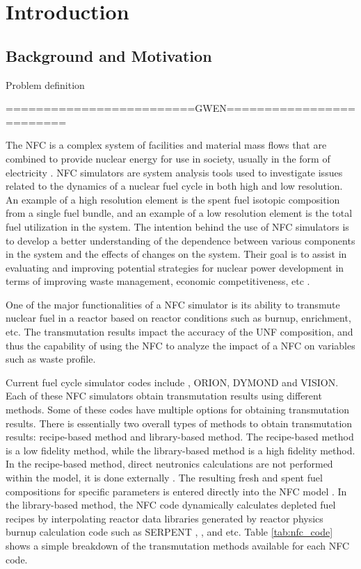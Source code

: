 \section{Introduction}
\subsection{Background and Motivation}
Problem definition

=========================GWEN=========================

The \gls{NFC} is a complex system of facilities and material 
mass flows that are combined to provide nuclear energy for use 
in society, usually in the form of electricity 
\cite{yacout_modeling_2005}. 
\gls{NFC} simulators are system analysis tools used to investigate 
issues related to the dynamics of a nuclear fuel cycle in both 
high and low resolution. 
An example of a high resolution element is the spent fuel 
isotopic composition from a single fuel bundle, and an example 
of a low resolution element is the total fuel utilization in 
the system. 
The intention behind the use of \gls{NFC} simulators is to develop 
a better understanding of the dependence between various components 
in the system and the effects of changes on the system. 
Their goal is to assist in evaluating and improving potential 
strategies for nuclear power development in terms of improving waste 
management, economic competitiveness, etc \cite{yacout_modeling_2005}.   

One of the major functionalities of a \gls{NFC} simulator is its 
ability to transmute nuclear fuel in a reactor based on reactor 
conditions such as burnup, enrichment, etc. 
The transmutation results impact the accuracy of the \gls{UNF} 
composition, and thus the capability of using the \gls{NFC} to 
analyze the impact of a \gls{NFC} on variables such as waste profile.  

Current fuel cycle simulator codes include \Cyclus, ORION, DYMOND 
and VISION. 
Each of these NFC simulators obtain transmutation results using 
different methods. 
Some of these codes have multiple options for obtaining 
transmutation results. 
There is essentially two overall types of methods to obtain transmutation 
results: recipe-based method and library-based method. 
The recipe-based method is a low fidelity method, while the library-based method is 
a high fidelity method. 
In the recipe-based method, direct neutronics calculations are not performed 
within the model, it is done externally \cite{yacout_vision_2006}. 
The resulting fresh and spent fuel compositions for specific parameters 
is entered directly into the \gls{NFC} model \cite{sunny_transition_2015}. 
In the library-based method,  the \gls{NFC} code dynamically calculates depleted 
fuel recipes by interpolating reactor data libraries generated by
reactor physics burnup calculation code such as SERPENT 
\cite{leppanen_serpent_2013}, \cite{ORIGEN} \cite{croff_users_1980}, and etc. 
Table \ref{tab:nfc_code} shows a simple breakdown of the 
transmutation methods available for each \gls{NFC} code. 

